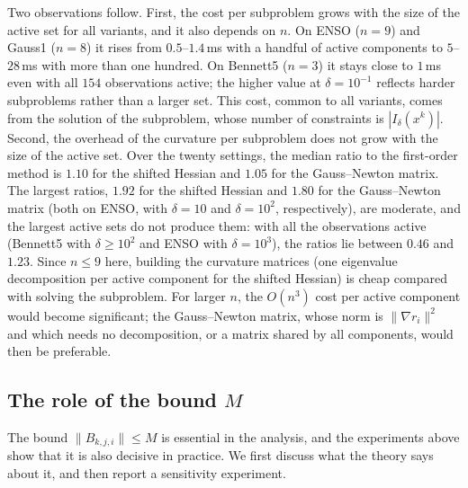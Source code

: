 \documentclass[11pt]{article}
\begin{document}
Two observations follow. First, the cost per subproblem grows with the size of
the active set for all variants, and it also depends on $n$. On ENSO ($n=9$) and
Gauss1 ($n=8$) it rises from $0.5$--$1.4$\,ms with a handful of active
components to $5$--$28$\,ms with more than one hundred. On Bennett5 ($n=3$) it
stays close to $1$\,ms even with all $154$ observations active; the higher
value at $\delta = 10^{-1}$ reflects harder subproblems rather than a larger
set. This cost, common to all variants, comes from the solution of the
subproblem, whose number of constraints is $|I_\delta(x^k)|$. Second, the
overhead of the curvature per subproblem does not grow with the size of the
active set. Over the twenty settings, the median ratio to the first-order
method is $1.10$ for the shifted Hessian and $1.05$ for the Gauss--Newton
matrix. The largest ratios, $1.92$ for the shifted Hessian and $1.80$ for the
Gauss--Newton matrix (both on ENSO, with $\delta = 10$ and $\delta = 10^2$,
respectively), are moderate, and the largest active sets do not produce them:
with all the observations active (Bennett5 with $\delta \geq 10^2$ and ENSO
with $\delta = 10^3$), the ratios lie between $0.46$ and $1.23$. Since $n \leq 9$ here,
building the curvature matrices (one eigenvalue decomposition per active
component for the shifted Hessian) is cheap compared with solving the
subproblem. For larger $n$, the $O(n^3)$ cost per active component would
become significant; the Gauss--Newton matrix, whose norm is
$\|\nabla r_i\|^2$ and which needs no decomposition, or a matrix shared by all
components, would then be preferable.

\subsection{The role of the bound \texorpdfstring{$M$}{M}} \label{subsec:M}

The bound $\|B_{k,j,i}\|\le M$ is essential in the analysis, and the
experiments above show that it is also decisive in practice. We first discuss
what the theory says about it, and then report a sensitivity experiment.
\end{document}
